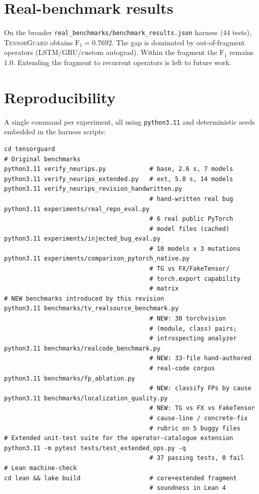 \documentclass{article}
\theoremstyle{definition}
\begin{document}
\section{Real-benchmark results}\label{app:real-benchmarks}
On the broader \texttt{real\_benchmarks/benchmark\_results.json}
harness ($44$ tests), \textsc{TensorGuard} obtains
$\mathrm{F}_1=0.7692$. The gap is dominated by out-of-fragment
operators (LSTM/GRU/custom autograd). Within the fragment the F$_1$
remains $1.0$. Extending the fragment to recurrent operators is left
to future work.

\section{Reproducibility}\label{app:repro}
A single command per experiment, all using \texttt{python3.11} and
deterministic seeds embedded in the harness scripts:
\begin{lstlisting}
cd tensorguard
# Original benchmarks
python3.11 verify_neurips.py            # base, 2.6 s, 7 models
python3.11 verify_neurips_extended.py   # ext, 5.8 s, 14 models
python3.11 verify_neurips_revision_handwritten.py
                                        # hand-written real bug
python3.11 experiments/real_repo_eval.py
                                        # 6 real public PyTorch
                                        # model files (cached)
python3.11 experiments/injected_bug_eval.py
                                        # 10 models x 3 mutations
python3.11 experiments/comparison_pytorch_native.py
                                        # TG vs FX/FakeTensor/
                                        # torch.export capability
                                        # matrix
# NEW benchmarks introduced by this revision
python3.11 benchmarks/tv_realsource_benchmark.py
                                        # NEW: 30 torchvision
                                        # (module, class) pairs;
                                        # introspecting analyzer
python3.11 benchmarks/realcode_benchmark.py
                                        # NEW: 33-file hand-authored
                                        # real-code corpus
python3.11 benchmarks/fp_ablation.py
                                        # NEW: classify FPs by cause
python3.11 benchmarks/localization_quality.py
                                        # NEW: TG vs FX vs FakeTensor
                                        # cause-line / concrete-fix
                                        # rubric on 5 buggy files
# Extended unit-test suite for the operator-catalogue extension
python3.11 -m pytest tests/test_extended_ops.py -q
                                        # 37 passing tests, 0 fail
# Lean machine-check
cd lean && lake build                   # core+extended fragment
                                        # soundness in Lean 4
\end{lstlisting}
\end{document}
